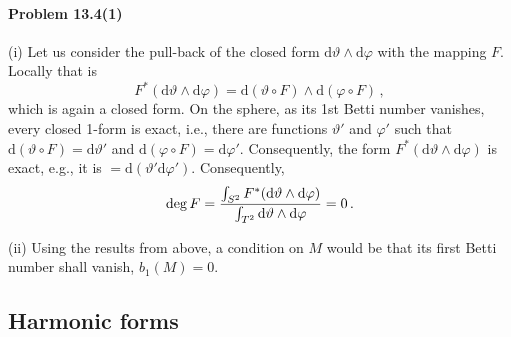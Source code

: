 \documentclass[a4paper,12pt]{article}
\def\d{\mathrm{d}}
\newcommand{\problem}[1]{\paragraph{Problem #1}}
\begin{document}

\problem{13.4(1)} (i) Let us consider the pull-back of the closed form $\d\vartheta\wedge\d\varphi$ with the mapping $F$. Locally that is
\[
 F^* (\d\vartheta\wedge \d\varphi)=\d (\vartheta\circ F)\wedge \d(\varphi\circ F)\,,
\]
which is again a closed form. On the sphere, as its 1st Betti number vanishes, every closed 1-form is exact, i.e., there are functions $\vartheta'$ and $\varphi'$ such that $\d(\vartheta\circ F) = \d\vartheta'$ and $\d(\varphi\circ F) = \d\varphi'$. Consequently, the form $F^*(\d\vartheta\wedge\d\varphi)$ is exact, e.g., it is $=\d (\vartheta' \d\varphi')$. Consequently,
\[
 \mathop{\rm deg} F = \frac{\int_{S^2} F^*(\d\vartheta\wedge\d\varphi)}{\int_{T^2}\d\vartheta\wedge\d\varphi} = 0\,. 
\]

(ii) Using the results from above, a condition on $M$ would be that its first Betti number shall vanish, $b_1(M)=0$.

\subsection{Harmonic forms}

\end{document}
